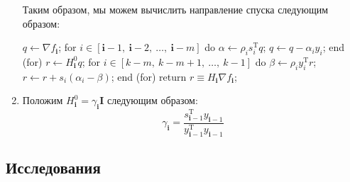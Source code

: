 \documentclass[12pt, a4paper, oneside, final]{article}
\begin{document}
\begin{enumerate}[1)]
\begin{itemize}
		\end{itemize}
		Таким образом, мы можем вычислить направление спуска следующим образом:
		\begin{mylisting}
			$q \gets \nabla{f_{\mathbf{i}}}$;
			for $i \in [\mathbf{i} - 1, ~ \mathbf{i} - 2, ~ \ldots, ~ \mathbf{i} - m]$ do
				$\alpha \gets \rho_{i}s_{i}^{\mathrm{T}}q$;
				$q \gets q - \alpha_{i}y_{i}$;
			end (for)
			$r \gets H_{\mathbf{i}}^{0}q$;
			for $i \in [k - m, ~ k - m + 1, ~ \ldots, ~ k - 1]$ do
				$\beta \gets \rho_{i}y_{i}^{\mathrm{T}}r$;
				$r \gets r + s_{i}(\alpha_{i} - \beta)$;
			end (for)
			return $r \equiv H_{\mathbf{i}}\nabla{f_{\mathbf{i}}}$;
		\end{mylisting}
		\item Положим $H_{\mathbf{i}}^{0} = \gamma_{\mathbf{i}}\mathbf{I}$ следующим образом:
		\[
			\gamma_{\mathbf{i}} = \dfrac{s_{\mathbf{i} - 1}^{\mathrm{T}}y_{\mathbf{i} - 1}}{y_{\mathbf{i} - 1}^{\mathrm{T}}y_{\mathbf{i} - 1}}
		\]
	\end{enumerate}
	\subsection*{Исследования}
\end{document}
